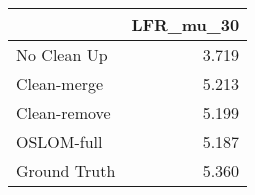 \begin{tabular}{lr}
\toprule
{} & LFR_mu_30 \\
\midrule
No Clean Up  &     3.719 \\
Clean-merge  &     5.213 \\
Clean-remove &     5.199 \\
OSLOM-full   &     5.187 \\
Ground Truth &     5.360 \\
\bottomrule
\end{tabular}
